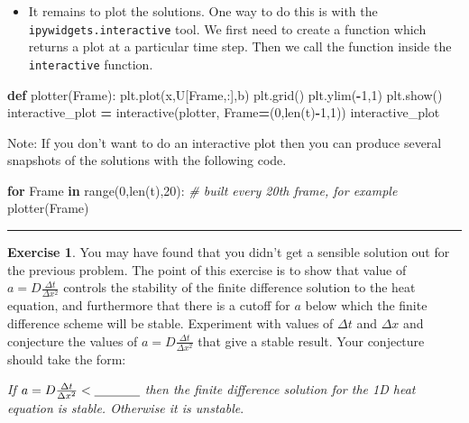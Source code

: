 \documentclass[
]{book}
\newenvironment{Shaded}{\begin{snugshade}}{\end{snugshade}}
\newcommand{\BuiltInTok}[1]{#1}
\newcommand{\CommentTok}[1]{\textcolor[rgb]{0.56,0.35,0.01}{\textit{#1}}}
\newcommand{\ControlFlowTok}[1]{\textcolor[rgb]{0.13,0.29,0.53}{\textbf{#1}}}
\newcommand{\DecValTok}[1]{\textcolor[rgb]{0.00,0.00,0.81}{#1}}
\newcommand{\KeywordTok}[1]{\textcolor[rgb]{0.13,0.29,0.53}{\textbf{#1}}}
\newcommand{\NormalTok}[1]{#1}
\newcommand{\OperatorTok}[1]{\textcolor[rgb]{0.81,0.36,0.00}{\textbf{#1}}}
\newcommand{\StringTok}[1]{\textcolor[rgb]{0.31,0.60,0.02}{#1}}
\providecommand{\tightlist}{%
  \setlength{\itemsep}{0pt}\setlength{\parskip}{0pt}}
\theoremstyle{definition}
\theoremstyle{definition}
\theoremstyle{definition}
\newtheorem{exercise}{Exercise}[chapter]
\theoremstyle{remark}
\begin{document}
\begin{itemize}
\tightlist
\item
  It remains to plot the solutions. One way to do this is with the \texttt{ipywidgets.interactive} tool. We first need to create a function which returns a plot at a particular time step. Then we call the function inside the \texttt{interactive} function.
\end{itemize}

\begin{Shaded}
\begin{Highlighting}[]
\KeywordTok{def}\NormalTok{ plotter(Frame):}
\NormalTok{    plt.plot(x,U[Frame,:],}\StringTok{\textquotesingle{}b\textquotesingle{}}\NormalTok{)}
\NormalTok{    plt.grid()}
\NormalTok{    plt.ylim(}\OperatorTok{{-}}\DecValTok{1}\NormalTok{,}\DecValTok{1}\NormalTok{)}
\NormalTok{    plt.show()}
\NormalTok{interactive\_plot }\OperatorTok{=}\NormalTok{ interactive(plotter, Frame}\OperatorTok{=}\NormalTok{(}\DecValTok{0}\NormalTok{,}\BuiltInTok{len}\NormalTok{(t)}\OperatorTok{{-}}\DecValTok{1}\NormalTok{,}\DecValTok{1}\NormalTok{))}
\NormalTok{interactive\_plot}
\end{Highlighting}
\end{Shaded}

Note: If you don't want to do an interactive plot then you can produce several snapshots of the solutions with the following code.

\begin{Shaded}
\begin{Highlighting}[]
\ControlFlowTok{for}\NormalTok{ Frame }\KeywordTok{in} \BuiltInTok{range}\NormalTok{(}\DecValTok{0}\NormalTok{,}\BuiltInTok{len}\NormalTok{(t),}\DecValTok{20}\NormalTok{): }\CommentTok{\# built every 20th frame, for example}
\NormalTok{    plotter(Frame)}
\end{Highlighting}
\end{Shaded}

\begin{center}\rule{0.5\linewidth}{0.5pt}\end{center}

\begin{exercise}
\protect\hypertarget{exr:unnamed-chunk-552}{}{\label{exr:unnamed-chunk-552} }You may have found that you didn't get a sensible solution out for the previous problem. The point of this exercise is to show that value of \(a = D\frac{\Delta t}{\Delta x^2}\) controls the stability of the finite difference solution to the heat equation, and furthermore that there is a cutoff for \(a\) below which the finite difference scheme will be stable. Experiment with values of \(\Delta t\) and \(\Delta x\) and conjecture the values of \(a = D \frac{\Delta t}{\Delta x^2}\) that give a stable result. Your conjecture should take the form:

\emph{If \(a = D\frac{\Delta t}{\Delta x^2} < \underline{\hspace{0.5in}}\) then the finite difference solution for the 1D heat equation is stable. Otherwise it is unstable}.
\end{exercise}
\end{document}
